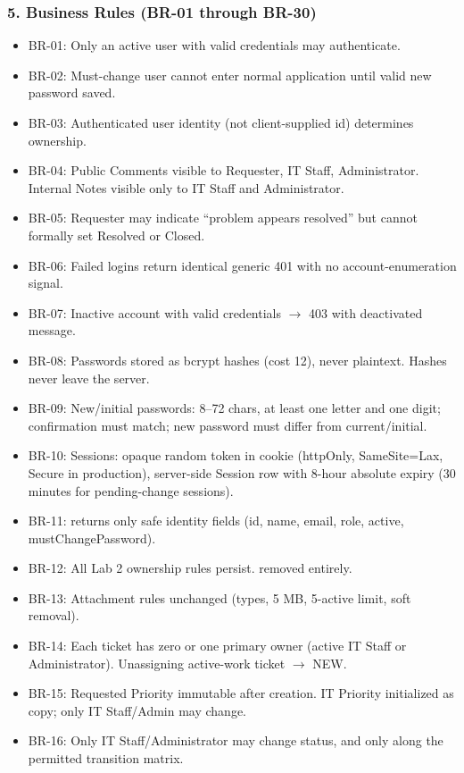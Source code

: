 \documentclass[11pt,a4paper]{article}
\begin{document}
\subsubsection*{5. Business Rules (BR-01 through BR-30)}
\begin{itemize}
\item BR-01: Only an active user with valid credentials may authenticate.
\item BR-02: Must-change user cannot enter normal application until valid new password saved.
\item BR-03: Authenticated user identity (not client-supplied id) determines ownership.
\item BR-04: Public Comments visible to Requester, IT Staff, Administrator. Internal Notes visible only to IT Staff and Administrator.
\item BR-05: Requester may indicate ``problem appears resolved'' but cannot formally set Resolved or Closed.
\item BR-06: Failed logins return identical generic 401 with no account-enumeration signal.
\item BR-07: Inactive account with valid credentials $\to$ 403 with deactivated message.
\item BR-08: Passwords stored as bcrypt hashes (cost 12), never plaintext. Hashes never leave the server.
\item BR-09: New/initial passwords: 8--72 chars, at least one letter and one digit; confirmation must match; new password must differ from current/initial.
\item BR-10: Sessions: opaque random token in cookie  (httpOnly, SameSite=Lax, Secure in production), server-side Session row with 8-hour absolute expiry (30 minutes for pending-change sessions).
\item BR-11:  returns only safe identity fields (id, name, email, role, active, mustChangePassword).
\item BR-12: All Lab 2 ownership rules persist.  removed entirely.
\item BR-13: Attachment rules unchanged (types, 5 MB, 5-active limit, soft removal).
\item BR-14: Each ticket has zero or one primary owner (active IT Staff or Administrator). Unassigning active-work ticket $\to$ NEW.
\item BR-15: Requested Priority immutable after creation. IT Priority initialized as copy; only IT Staff/Admin may change.
\item BR-16: Only IT Staff/Administrator may change status, and only along the permitted transition matrix.

\end{itemize}
\end{document}
